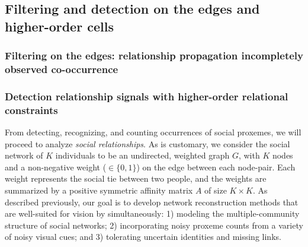
\subsection{Filtering and detection on the edges and higher-order cells}
\label{sec:vis2net}
\vspace{-5pt}

\subsubsection{Filtering on the edges: relationship propagation incompletely observed  co-occurrence}

\subsubsection{Detection relationship signals with higher-order relational constraints}


From detecting, recognizing, and counting occurrences of social proxemes, we will proceed to analyze \emph{social relationships}. As is customary, we consider the social network of $K$ individuals to be an undirected, weighted graph $G$, with $K$ nodes and a non-negative weight ($\in \{0,1\}$) on the edge between each node-pair. Each weight represents the social tie between two people, and the weights are summarized by a positive symmetric affinity matrix $A$ of size $K\times K$. As described previously, our goal is to develop network reconstruction methods that are well-suited for vision by simultaneously: 1) modeling the multiple-community structure of social networks; 2) incorporating noisy proxeme counts from a variety of noisy visual cues; and 3) tolerating uncertain identities and missing links.

